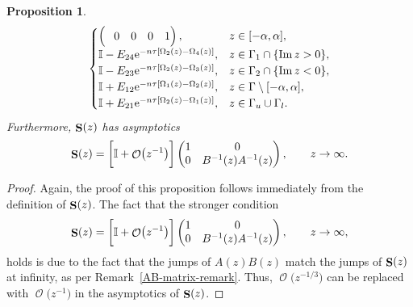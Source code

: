 \documentclass[10pt,a4paper]{amsart}
\DeclareMathOperator{\OO}{\mathcal{O}}
\DeclareMathOperator{\boldS}{{\bf S}}
\numberwithin{equation}{section}
\newtheorem{Proposition}[Theorem]{Proposition}
 { \theoremstyle{definition}
\newtheorem{Definition}[Theorem]{Definition}
\newtheorem{Note}[Theorem]{Note}
\newtheorem{Example}[Theorem]{Example}
\newtheorem{Remark}[Theorem]{Remark} }
\begin{document}
\begin{Proposition}
\begin{equation*}
\begin{cases}
\begin{pmatrix}
 \hphantom{-}0 & 0 & 0 & 1
 \end{pmatrix}, & z\in [-\alpha,\alpha],\\
 \mathbb{I} - E_{24}{\rm e}^{-n\tau[\Omega_2(z) - \Omega_4(z)]},
 & z \in \Gamma_1 \cap \{\operatorname{Im} z > 0\},\\
 \mathbb{I} - E_{23}{\rm e}^{-n\tau[\Omega_2(z) - \Omega_3(z)]},
 & z \in \Gamma_2 \cap \{\operatorname{Im} z < 0\},\\
 \mathbb{I} + E_{12}{\rm e}^{-n\tau[\Omega_1(z) - \Omega_2(z)]},
 & z\in \Gamma \setminus [-\alpha,\alpha],\\
 \mathbb{I} + E_{21}{\rm e}^{-n\tau[\Omega_{2}(z)-\Omega_{1}(z)]}, & z\in \Gamma_{u}\cup\Gamma_{l}.\\
 \end{cases}
 \end{equation*}
Furthermore, $\boldS(z)$ has asymptotics
\begin{equation*} %
 \boldS(z) =
 \biggl[\mathbb{I} + \OO\bigl(z^{-1}\bigr)\biggr]
 \begin{pmatrix}
 1 & 0\\
 0 & B^{-1}(z) A^{-1}(z)
 \end{pmatrix},
 \qquad z \to \infty .
 \end{equation*}
 \end{Proposition}
\begin{proof}
 Again, the proof of this proposition follows immediately from the definition of $\boldS(z)$. The fact that the stronger condition
 \begin{equation*}
 \boldS(z) =
 \biggl[\mathbb{I} + \OO\bigl(z^{-1}\bigr)\biggr]
 \begin{pmatrix}
 1 & 0\\
 0 & B^{-1}(z) A^{-1}(z)
 \end{pmatrix},
 \qquad z \to \infty,
 \end{equation*}
 holds is due to the fact that the jumps of $A(z)B(z)$ match the jumps of $\boldS(z)$ at infinity, as per Remark~\ref{AB-matrix-remark}. Thus,
 $\OO\bigl(z^{-1/3}\bigr)$ can be replaced with $\OO\bigl(z^{-1}\bigr)$ in the asymptotics of $\boldS(z)$.
\end{proof}
\end{document}

